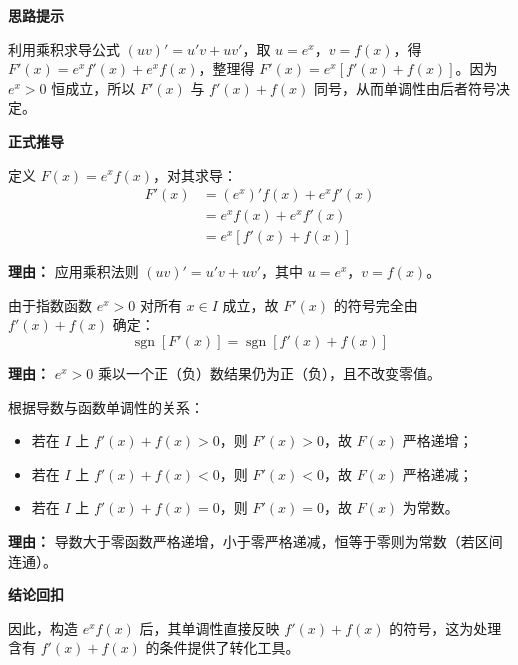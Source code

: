 \begin{proofbox}
	\textbf{\textcolor{CProof}{思路提示}}

	利用乘积求导公式 $(uv)'=u'v+uv'$，取 $u=e^x$，$v=f(x)$，得 $F'(x)=e^x f'(x)+e^x f(x)$，整理得 $F'(x)=e^x[f'(x)+f(x)]$。因为 $e^x>0$ 恒成立，所以 $F'(x)$ 与 $f'(x)+f(x)$ 同号，从而单调性由后者符号决定。

	\medskip
	\textbf{\textcolor{CProof}{正式推导}}
	\begin{description}[style=nextline, leftmargin=2.8em, labelsep=0.5em, itemsep=0.55em]
		\item[\textbf{步骤一（求导表达）：}] 定义 $F(x)=e^{x}f(x)$，对其求导：
			\[
				\begin{aligned}
					F'(x) &= (e^{x})'f(x) + e^{x}f'(x) \\
					&= e^{x}f(x) + e^{x}f'(x) \\
					&= e^{x}[f'(x)+f(x)]
			\end{aligned}
			\]
			\par\textbf{理由：} 应用乘积法则 $(uv)'=u'v+uv'$，其中 $u=e^x$，$v=f(x)$。

		\item[\textbf{步骤二（符号传递）：}] 由于指数函数 $e^{x}>0$ 对所有 $x\in I$ 成立，故 $F'(x)$ 的符号完全由 $f'(x)+f(x)$ 确定：
			\[
				\operatorname{sgn}[F'(x)] = \operatorname{sgn}[f'(x)+f(x)]
			\]
			\par\textbf{理由：} $e^x>0$ 乘以一个正（负）数结果仍为正（负），且不改变零值。

		\item[\textbf{步骤三（单调归纳）：}] 根据导数与函数单调性的关系：
			\begin{itemize}
			\item 若在 $I$ 上 $f'(x)+f(x)>0$，则 $F'(x)>0$，故 $F(x)$ 严格递增；
			\item 若在 $I$ 上 $f'(x)+f(x)<0$，则 $F'(x)<0$，故 $F(x)$ 严格递减；
			\item 若在 $I$ 上 $f'(x)+f(x)=0$，则 $F'(x)=0$，故 $F(x)$ 为常数。
		\end{itemize}
			\par\textbf{理由：} 导数大于零函数严格递增，小于零严格递减，恒等于零则为常数（若区间连通）。
	\end{description}

	\medskip
	\textbf{\textcolor{CProof}{结论回扣}}

	因此，构造 $e^x f(x)$ 后，其单调性直接反映 $f'(x)+f(x)$ 的符号，这为处理含有 $f'(x)+f(x)$ 的条件提供了转化工具。
\end{proofbox}
